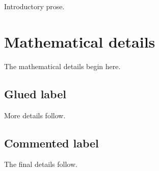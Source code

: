 Introductory prose.
\section{Mathematical details}
\label{sec:math-details}
\label{sec:math-details-alias}
The mathematical details begin here.
\subsection{Glued label}\label{sec:glued-label}
More details follow.
\subsection{Commented label}
\label{sec:commented-label}
The final details follow.
